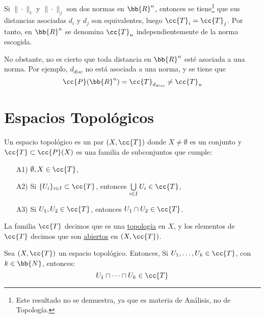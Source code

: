 \begin{observacion}
    Si $\|\cdot \|_i$ y $\|\cdot \|_j$ son dos normas en $\bb{R}^n$, entonces se tiene\footnote{Este resultado no se demuestra, ya que es materia de Análisis, no de Topología.} que sus distancias asociadas $d_i$ y $d_j$ son equivalentes, luego $\cc{T}_i=\cc{T}_j$. Por tanto, en $\bb{R}^n$ se denomina $\cc{T}_u$ independientemente de la norma escogida.

    No obstante, no es cierto que toda distancia en $\bb{R}^n$ esté asociada a una norma. Por ejemplo, $d_{disc}$ no está asociada a una norma, y se tiene que
    $$\cc{P}(\bb{R}^n)=\cc{T}_{d_{disc}}\neq \cc{T}_{u}$$
\end{observacion}







\section{Espacios Topológicos}
\begin{definicion}
    Un espacio topológico es un par $(X,\cc{T})$ donde $X\neq \emptyset$ es un conjunto y $\cc{T}\subset \cc{P}(X)$ es una familia de subconjuntos que cumple:
    \begin{enumerate}
        \item[A1)] $\emptyset, X\in \cc{T}$,
        \item[A2)] Si $\{U_i\}_{i\in I}\subset \cc{T}$, entonces $\bigcup\limits_{i\in I}U_i\in \cc{T}$,
        \item[A3)] Si $U_1,U_2\in \cc{T}$, entonces $U_1\cap U_2\in \cc{T}$.
    \end{enumerate}

    La familia $\cc{T}$ decimos que es una \ul{topología} en $X$, y los elementos de $\cc{T}$ decimos que son \ul{abiertos} en $(X,\cc{T})$.
\end{definicion}

\begin{prop} Sea $(X,\cc{T})$ un espacio topológico. Entonces, 
    Si $U_1,\dots,U_k\in \cc{T}$, con $k\in \bb{N}$, entonces:
    \begin{equation*}
        U_1 \cap \dots \cap U_k \in \cc{T}
    \end{equation*}
\end{prop}

